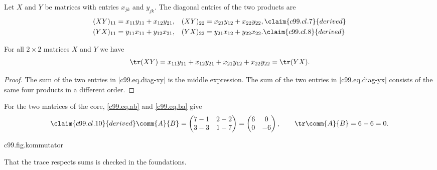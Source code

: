 \begin{vertiefung}[id=c99.v1,
    titel={Why the traces agree},
    wozu={The core states Theorem~\ref{c99.thm.spur} without proof; here it is
      worked out for arbitrary entries.},
    voraussetzung={Core~\ref{c99.s1} up to equation~\eqref{c99.eq.spuren}; not
      needed for Section~\ref{c99.s2}.},
    zurueck={The trace of a product does not depend on the order of the factors;
      the product itself does.}]
  Let $X$ and $Y$ be matrices with entries $x_{jk}$ and $y_{jk}$. The diagonal
  entries of the two products are
  \begin{align}
    (XY)_{11} &= x_{11}y_{11} + x_{12}y_{21}, &
    (XY)_{22} &= x_{21}y_{12} + x_{22}y_{22},
    \label{c99.eq.diag-xy}\claim{c99.cl.7}{derived} \\
    (YX)_{11} &= y_{11}x_{11} + y_{12}x_{21}, &
    (YX)_{22} &= y_{21}x_{12} + y_{22}x_{22}.
    \label{c99.eq.diag-yx}\claim{c99.cl.8}{derived}
  \end{align}

  \begin{lemma}\label{c99.lem.spur}
    For all $2\times 2$ matrices $X$ and $Y$ we have
    \begin{equation}\label{c99.eq.spur-allgemein}
      \tr(XY) = x_{11}y_{11} + x_{12}y_{21} + x_{21}y_{12} + x_{22}y_{22} = \tr(YX).
    \end{equation}
  \end{lemma}
  \begin{proof}
    The sum of the two entries in \eqref{c99.eq.diag-xy} is the middle
    expression. The sum of the two entries in \eqref{c99.eq.diag-yx} consists of
    the same four products in a different order.
  \end{proof}


  For the two matrices of the core, \eqref{c99.eq.ab} and \eqref{c99.eq.ba} give
  \begin{equation}\label{c99.eq.kommutator}\claim{c99.cl.10}{derived}
    \comm{A}{B} = \begin{pmatrix} 7-1 & 2-2 \\ 3-3 & 1-7 \end{pmatrix}
                = \begin{pmatrix} 6 & 0 \\ 0 & -6 \end{pmatrix},
    \qquad
    \tr\comm{A}{B} = 6 - 6 = 0.
  \end{equation}

  \begin{tpcfigure}{c99.fig.kommutator}
    \caption{The commutator of \eqref{c99.eq.kommutator} as a map: it stretches
      by the factor $6$ and reflects in the horizontal axis.}
  \end{tpcfigure}

  That the trace respects sums is checked in the foundations.
\end{vertiefung}

